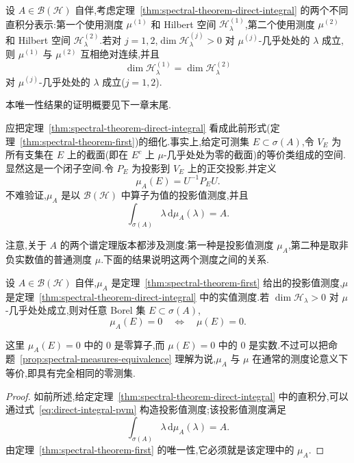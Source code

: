 {\begin{proposition}\label{prop:direct-integral-uniqueness}
设 \(A\in\mathcal{B}(\mathcal{H})\) 自伴,考虑定理~\ref{thm:spectral-theorem-direct-integral} 的两个不同直积分表示:第一个使用测度 \(\mu^{(1)}\) 和 Hilbert 空间 \(\mathcal{H}_{\lambda}^{(1)}\),第二个使用测度 \(\mu^{(2)}\) 和 Hilbert 空间 \(\mathcal{H}_{\lambda}^{(2)}\).若对 \(j=1,2\),\(\dim\mathcal{H}_{\lambda}^{(j)}>0\) 对 \(\mu^{(j)}\)-几乎处处的 \(\lambda\) 成立,则 \(\mu^{(1)}\) 与 \(\mu^{(2)}\) 互相绝对连续,并且
\[
\dim\mathcal{H}_{\lambda}^{(1)}=\dim\mathcal{H}_{\lambda}^{(2)}
\]
对 \(\mu^{(j)}\)-几乎处处的 \(\lambda\) 成立(\(j=1,2\)).
\end{proposition}

本唯一性结果的证明概要见下一章末尾.

应把定理~\ref{thm:spectral-theorem-direct-integral} 看成此前形式(定理~\ref{thm:spectral-theorem-first})的细化.事实上,给定可测集 \(E\subset\sigma(A)\),令 \(V_{E}\) 为所有支集在 \(E\) 上的截面(即在 \(E^{c}\) 上 \(\mu\)-几乎处处为零的截面)的等价类组成的空间.显然这是一个闭子空间.令 \(P_{E}\) 为投影到 \(V_{E}\) 上的正交投影,并定义
\[
\mu_{A}(E)=U^{-1}P_{E}U.
\label{eq:direct-integral-pvm}
\]
不难验证,\(\mu_{A}\) 是以 \(\mathcal{B}(\mathcal{H})\) 中算子为值的投影值测度,并且
\[
\int_{\sigma(A)}\lambda\,\mathrm{d}\mu_{A}(\lambda)=A.
\]

注意,关于 \(A\) 的两个谱定理版本都涉及测度:第一种是投影值测度 \(\mu_{A}\),第二种是取非负实数值的普通测度 \(\mu\).下面的结果说明这两个测度之间的关系.

\begin{proposition}[两种谱测度的零集]\label{prop:spectral-measures-equivalence}
设 \(A\in\mathcal{B}(\mathcal{H})\) 自伴,\(\mu_{A}\) 是定理~\ref{thm:spectral-theorem-first} 给出的投影值测度,\(\mu\) 是定理~\ref{thm:spectral-theorem-direct-integral} 中的实值测度.若 \(\dim\mathcal{H}_{\lambda}>0\) 对 \(\mu\)-几乎处处成立,则对任意 Borel 集 \(E\subset\sigma(A)\),
\[
\mu_{A}(E)=0\quad\Longleftrightarrow\quad\mu(E)=0.
\]
\end{proposition}

这里 \(\mu_{A}(E)=0\) 中的 0 是零算子,而 \(\mu(E)=0\) 中的 0 是实数.不过可以把命题~\ref{prop:spectral-measures-equivalence} 理解为说,\(\mu_{A}\) 与 \(\mu\) 在通常的测度论意义下等价,即具有完全相同的零测集.

\begin{proof}
如前所述,给定定理~\ref{thm:spectral-theorem-direct-integral} 中的直积分,可以通过式~\eqref{eq:direct-integral-pvm} 构造投影值测度;该投影值测度满足
\[
\int_{\sigma(A)}\lambda\,\mathrm{d}\mu_{A}(\lambda)=A.
\]
由定理~\ref{thm:spectral-theorem-first} 的唯一性,它必须就是该定理中的 \(\mu_{A}\).


\end{proof}}
